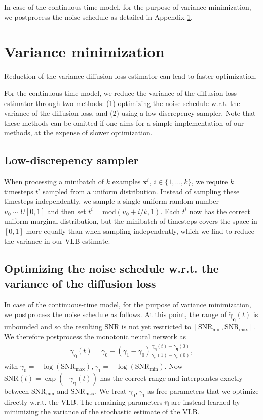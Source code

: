 \documentclass{article}
\def\rvx{{\mathbf{x}}}
\newcommand{\boldeta}{{\boldsymbol{\eta}}}
\newcommand{\snr}{\text{SNR}}
\newcommand{\snrmin}{\text{SNR}_{\text{min}}}
\newcommand{\snrmax}{\text{SNR}_{\text{max}}}
\begin{document}
In case of the continuous-time model, for the purpose of variance minimization, we postprocess the noise schedule as detailed in Appendix \ref{app:variance_minimization}.

\section{Variance minimization}
\label{app:variance_minimization}

Reduction of the variance diffusion loss estimator can lead to faster optimization. 

For the continuous-time model, we reduce the variance of the diffusion loss estimator through two methods: (1) optimizing the noise schedule w.r.t. the variance of the diffusion loss, and (2) using a low-discrepency sampler. Note that these methods can be omitted if one aims for a simple implementation of our methods, at the expense of slower optimization.

\subsection{Low-discrepency sampler}
\label{sec:lowdisc}
When processing a minibatch of $k$ examples $\rvx^{i}$, $i \in \{1,\ldots,k\}$, we require $k$ timesteps $t^{i}$ sampled from a uniform distribution. Instead of sampling these timesteps independently, we sample a single uniform random number $u_{0} \sim U[0,1]$ and then set $t^{i} = \text{mod}(u_{0} + i/k, 1)$. Each $t^{i}$ now has the correct uniform marginal distribution, but the minibatch of timesteps covers the space in $[0,1]$ more equally than when sampling independently, which we find to reduce the variance in our VLB estimate.

\subsection{Optimizing the noise schedule w.r.t. the variance of the diffusion loss}
In case of the continuous-time model, for the purpose of variance minimization, we postprocess the noise schedule as follows. At this point, the range of $\tilde{\gamma}_{\boldeta}(t)$ is unbounded and so the resulting $\snr$ is not yet restricted to $[\snrmin,\snrmax]$. We therefore postprocess the monotonic neural network as
\begin{align}
\gamma_{\boldeta}(t) = \gamma_0 + (\gamma_1 - \gamma_0)\frac{\tilde{\gamma}_{\boldeta}(t) - \tilde{\gamma}_{\boldeta}(0)}{\tilde{\gamma}_{\boldeta}(1) - \tilde{\gamma}_{\boldeta}(0)},
\end{align}
with $\gamma_0 = -\log(\snrmax), \gamma_1 = -\log(\snrmin)$. Now $\snr(t) = \exp(-\gamma_{\boldeta}(t))$ has the correct range and interpolates exactly between $\snrmin$ and $\snrmax$. We treat $\gamma_0, \gamma_1$ as free parameters that we optimize directly w.r.t. the VLB. The remaining parameters $\boldeta$ are instead learned by minimizing the variance of the stochastic estimate of the VLB.
\end{document}

